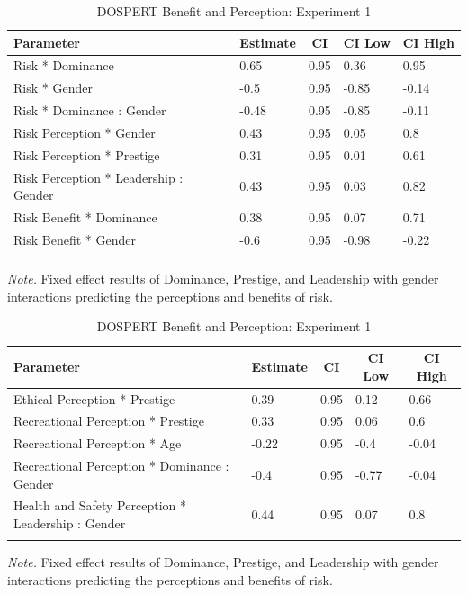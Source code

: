 \documentclass[
  donotrepeattitle,doc, 12pt, a4paper,floatsintext]{apa7}
\begin{document}
\begin{table}[h]
\begin{center}
\begin{threeparttable}
\caption{\label{tab:m5_int_fixef_exp_1}DOSPERT Benefit and Perception: Experiment 1}
\begin{tabular}{lllll}
\toprule
Parameter & \multicolumn{1}{c}{Estimate} & \multicolumn{1}{c}{CI} & \multicolumn{1}{c}{CI Low} & \multicolumn{1}{c}{CI High}\\
\midrule
Risk * Dominance & 0.65 & 0.95 & 0.36 & 0.95\\
Risk * Gender & -0.5 & 0.95 & -0.85 & -0.14\\
Risk * Dominance : Gender & -0.48 & 0.95 & -0.85 & -0.11\\
Risk Perception * Gender & 0.43 & 0.95 & 0.05 & 0.8\\
Risk Perception * Prestige & 0.31 & 0.95 & 0.01 & 0.61\\
Risk Perception * Leadership : Gender & 0.43 & 0.95 & 0.03 & 0.82\\
Risk Benefit * Dominance & 0.38 & 0.95 & 0.07 & 0.71\\
Risk Benefit * Gender & -0.6 & 0.95 & -0.98 & -0.22\\
\bottomrule
\addlinespace
\end{tabular}
\begin{tablenotes}[para]
\normalsize{\textit{Note.} Fixed effect results of Dominance, Prestige, and Leadership with gender interactions predicting the perceptions and benefits of risk.}
\end{tablenotes}
\end{threeparttable}
\end{center}
\end{table}
\begin{table}[h]
\begin{center}
\begin{threeparttable}
\caption{\label{tab:m4_perceivedRisk_Gender_exp_1}DOSPERT Benefit and Perception: Experiment 1}
\begin{tabular}{lllll}
\toprule
Parameter & \multicolumn{1}{c}{Estimate} & \multicolumn{1}{c}{CI} & \multicolumn{1}{c}{CI Low} & \multicolumn{1}{c}{CI High}\\
\midrule
Ethical Perception * Prestige & 0.39 & 0.95 & 0.12 & 0.66\\
Recreational Perception * Prestige & 0.33 & 0.95 & 0.06 & 0.6\\
Recreational Perception * Age & -0.22 & 0.95 & -0.4 & -0.04\\
Recreational Perception * Dominance : Gender & -0.4 & 0.95 & -0.77 & -0.04\\
Health and Safety Perception * Leadership : Gender & 0.44 & 0.95 & 0.07 & 0.8\\
\bottomrule
\addlinespace
\end{tabular}
\begin{tablenotes}[para]
\normalsize{\textit{Note.} Fixed effect results of Dominance, Prestige, and Leadership with gender interactions predicting the perceptions and benefits of risk.}
\end{tablenotes}
\end{threeparttable}
\end{center}
\end{table}
\end{document}

